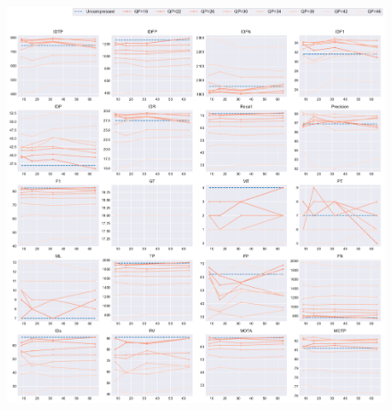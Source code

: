 \begin{figure}[!htbp]
\centering
\includegraphics[width=1.0\linewidth]{img/appendix/BasketballPass_all_multiplots_msr.pdf}
\caption[Result of all object classes in Class D BasketballPass with Horizontal Axis of MSR]{}
\label{fig:BasketballPass_all_msr}
\end{figure}



